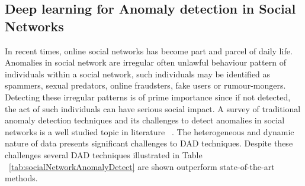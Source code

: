 \subsection{Deep learning for Anomaly detection in Social Networks}
In recent times, online social networks has become part and parcel of daily life. Anomalies in social network
are irregular often unlawful behaviour pattern of individuals within a social network, such  individuals may be identified as  spammers, sexual predators, online fraudsters, fake users or rumour-mongers. Detecting these irregular patterns is of prime importance since if not detected, the act of such individuals can have serious social impact. A survey of traditional anomaly detection techniques and its challenges to detect anomalies in social networks is a well studied topic in literature ~\cite{liu2017social,savage2014anomaly,anand2017anomaly,yu2016survey,cao2018automatic,yu2016survey}. The heterogeneous and dynamic nature of data presents significant challenges to DAD techniques. Despite these challenges several DAD techniques illustrated in Table ~\ref{tab:socialNetworkAnomalyDetect} are shown outperform state-of-the-art methods.

\begin{table*}
  \begin{center}
   \caption{Examples of DAD techniques used to detect anomalies in social network.
            \\CNN: Convolution Neural Networks, LSTM : Long Short Term Memory Networks
            \\AE: Autoencoders, DAE: Denoising Autoencoders
            \\SVM : Support Vector Machines., DNN : Deep Neural Network  }
    \captionsetup{justification=centering}
    \label{tab:socialNetworkAnomalyDetect}
  \end{center}
\end{table*}





